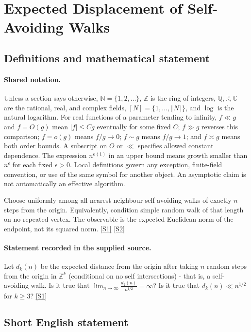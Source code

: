 \documentclass[11pt,a4paper]{article}
\newcommand{\N}{\mathbb{N}}
\newcommand{\Z}{\mathbb{Z}}
\newcommand{\Q}{\mathbb{Q}}
\newcommand{\R}{\mathbb{R}}
\newcommand{\C}{\mathbb{C}}
\newcommand{\sref}[2]{\hyperlink{source:#1:#2}{[S#2]}}
\begin{document}
\section{Expected Displacement of Self-Avoiding Walks}\label{statement}


\subsection{Definitions and mathematical statement}

\paragraph{Shared notation.}Unless a section says otherwise, $\N=\{1,2,\ldots\}$,
$\Z$ is the ring of integers, $\Q,\R,\C$ are the rational, real, and complex
fields, $[N]=\{1,\ldots,\lfloor N\rfloor\}$, and $\log$ is the natural
logarithm. For real functions of a parameter tending to infinity,
$f\ll g$ and $f=O(g)$ mean $|f|\leq Cg$ eventually for some fixed $C$;
$f\gg g$ reverses this comparison; $f=o(g)$ means $f/g\to0$;
$f\sim g$ means $f/g\to1$; and $f\asymp g$ means both order bounds.
A subscript on $O$ or $\ll$ specifies allowed constant dependence.
The expression $n^{o(1)}$ in an upper bound means growth smaller than
$n^\epsilon$ for each fixed $\epsilon>0$. Local definitions govern any
exception, finite-field convention, or use of the same symbol for another
object. An asymptotic claim is not automatically an effective algorithm.



Choose uniformly among all nearest-neighbour self-avoiding walks of exactly $n$ steps from the origin. Equivalently, condition simple random walk of that length on no repeated vertex. The observable is the expected Euclidean norm of the endpoint, not its squared norm. \sref{statement}{1} \sref{statement}{2}

\paragraph{Statement recorded in the supplied source.}
Let $d_k(n)$ be the expected distance from the origin after taking $n$ random steps from the origin in $\mathbb{Z}^k$ (conditional on no self intersections) - that is, a self-avoiding walk. Is it true that $ \lim_{n\to \infty}\frac{d_2(n)}{n^{1/2}}= \infty? $ Is it true that $ d_k(n)\ll n^{1/2} $ for $k\geq 3$? \sref{statement}{1}

\subsection{Short English statement}
\end{document}
